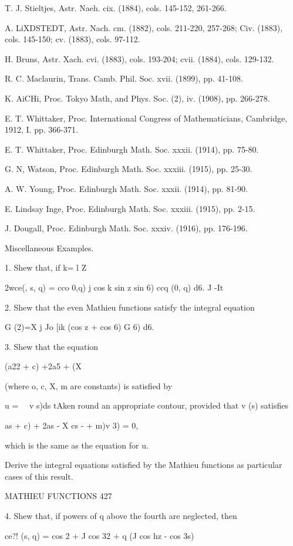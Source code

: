 {{T. J. Stieltjes, Astr. Naeh. cix. (1884), cols. 145-152, 261-266.

A. LiXDSTEDT, Astr. Nach. cm. (1882), cols. 211-220, 257-268; Civ.
(1883), cols. 145-150; cv. (1883), cols. 97-112.

H. Bruns, Astr. Xach. cvi. (1883), cols. 193-204; cvii. (1884), cols.
129-132.

R. C. Maclaurin, Trans. Camb. Phil. Soc. xvii. (1899), pp. 41-108.

K. AiCHi, Proc. Tokyo Math, and Phys. Soc. (2), iv. (1908), pp.
266-278.

E. T. Whittaker, Proc. International Congress of Mathematicians,
Cambridge, 1912, I. pp. 366-371.

E. T. Whittaker, Proc. Edinburgh Math. Soc. xxxii. (1914), pp. 75-80.

G. N, Watson, Proc. Edinburgh Math. Soc. xxxiii. (1915), pp. 25-30.

A. W. Young, Proc. Edinburgh Math. Soc. xxxii. (1914), pp. 81-90.

E. Lindsay Inge, Proc. Edinburgh Math. Soc. xxxiii. (1915), pp. 2-15.

J. Dougall, Proc. Edinburgh Math. Soc. xxxiv. (1916), pp. 176-196.

Miscellaneous Examples.

1. Shew that, if k= l Z \

2wce(, s, q) = cco 0,q) j cos k sin z sin 6) ccq (0, q) d6. J -It

2. Shew that the even Mathieu functions satisfy the integral equation

G (2)=X j Jo [ik (cos z + cos 6) G 6) d6.

3. Shew that the equation

(a22 + c) +2a5 + (X%

(where o, c, X, m are constants) is satisfied by

u = \ \ v s)ds tAken round an appropriate contour, provided that v (s)
satisfies

 as + c) + 2as - X cs - + m)v 3) = 0,

which is the same as the equation for u.

Derive the integral equations satisfied by the Mathieu functions as
particular cases of this result.

MATHIEU FUNCTIONS 427

4. Shew that, if powers of q above the fourth are neglected, then

ce?! (s, q) = cos 2 + J cos 32 + q (J cos hz - cos 3s)

}}
